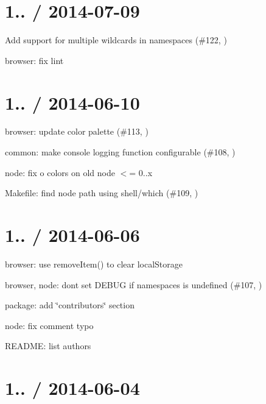 \section*{1.. / 2014-\/07-\/09 }


\begin{DoxyItemize}
\item Add support for multiple wildcards in namespaces (\#122, )
\item browser\+: fix lint
\end{DoxyItemize}

\section*{1.. / 2014-\/06-\/10 }


\begin{DoxyItemize}
\item browser\+: update color palette (\#113, )
\item common\+: make console logging function configurable (\#108, )
\item node\+: fix o colors on old node $<$= 0..\+x
\item Makefile\+: find node path using shell/which (\#109, )
\end{DoxyItemize}

\section*{1.. / 2014-\/06-\/06 }


\begin{DoxyItemize}
\item browser\+: use {\ttfamily remove\+Item()} to clear local\+Storage
\item browser, node\+: don\textquotesingle{}t set D\+E\+B\+UG if namespaces is undefined (\#107, )
\item package\+: add \char`\"{}contributors\char`\"{} section
\item node\+: fix comment typo
\item R\+E\+A\+D\+ME\+: list authors
\end{DoxyItemize}

\section*{1.. / 2014-\/06-\/04 }


